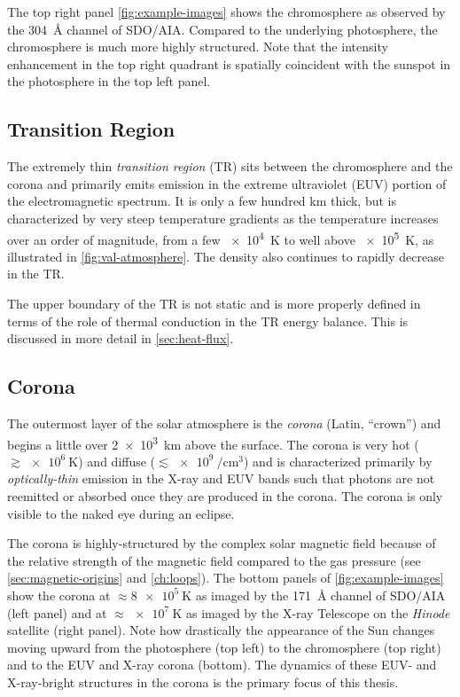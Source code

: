 The top right panel \autoref{fig:example-images} shows the chromosphere as observed by the \SI{304}{\angstrom} channel of SDO/AIA. Compared to the underlying photosphere, the chromosphere is much more highly structured. Note that the intensity enhancement in the top right quadrant is spatially coincident with the sunspot in the photosphere in the top left panel.

\subsection{Transition Region}\label{sec:transition_region}

The extremely thin \textit{transition region} (TR) sits between the chromosphere and the corona and primarily emits emission in the extreme ultraviolet (EUV) portion of the electromagnetic spectrum. It is only a few hundred \si{\km} thick, but is characterized by very steep temperature gradients as the temperature increases over an order of magnitude, from a few \SI{e4}{\kelvin} to well above \SI{e5}{\kelvin}, as illustrated in \autoref{fig:val-atmosphere}. The density also continues to rapidly decrease in the TR.

The upper boundary of the TR is not static and is more properly defined in terms of the role of thermal conduction in the TR energy balance. This is discussed in more detail in \autoref{sec:heat-flux}.

\subsection{Corona}\label{sec:corona}

The outermost layer of the solar atmosphere is the \textit{corona} (Latin, ``crown'') and begins a little over \SI{2e3}{\km} above the surface. The corona is very hot ($\gtrsim\SI{e6}{\kelvin}$) and diffuse ($\lesssim\SI{e9}{\per\cubic\cm}$) and is characterized primarily by \textit{optically-thin} emission in the X-ray and EUV bands such that photons are not reemitted or absorbed once they are produced in the corona. The corona is only visible to the naked eye during an eclipse.

The corona is highly-structured by the complex solar magnetic field because of the relative strength of the magnetic field compared to the gas pressure (see \autoref{sec:magnetic-origins} and \autoref{ch:loops}). The bottom panels of \autoref{fig:example-images} show the corona at $\approx\SI{8e5}{\kelvin}$ as imaged by the \SI{171}{\angstrom} channel of SDO/AIA (left panel) and at $\approx\SI{e7}{\kelvin}$ as imaged by the X-ray Telescope \citep[XRT][]{golub_x-ray_2007} on the \textit{Hinode} satellite \citep{kosugi_hinode_2007} (right panel). Note how drastically the appearance of the Sun changes moving upward from the photosphere (top left) to the chromosphere (top right) and to the EUV and X-ray corona (bottom). The dynamics of these EUV- and X-ray-bright structures in the corona is the primary focus of this thesis.

